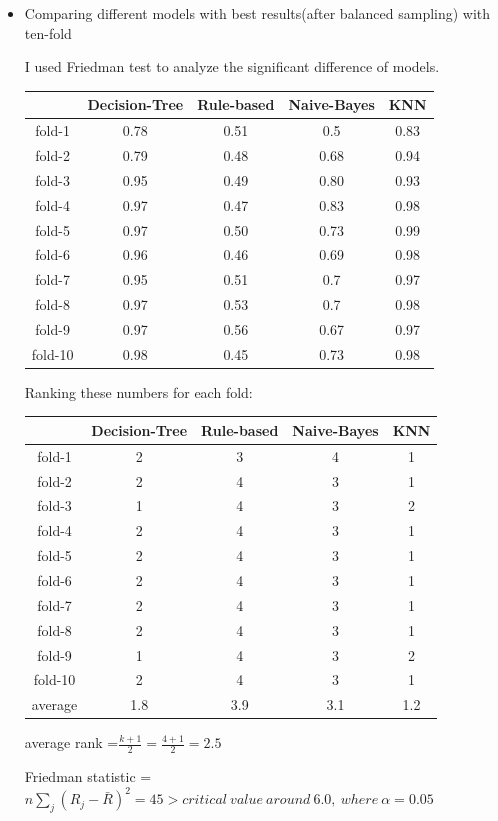 \documentclass{article}
\begin{document}
\begin{itemize}
\item Comparing different models with best results(after balanced sampling) with ten-fold

I used Friedman test to analyze the significant difference of models.

\begin{tabular}{c|c|c|c|c}
\hline
 &Decision-Tree &Rule-based &Naive-Bayes &KNN\\
\hline
fold-1 &0.78 &0.51 &0.5 &0.83\\
\hline
fold-2 &0.79 &0.48 &0.68 &0.94\\
\hline
fold-3 &0.95 &0.49 &0.80 &0.93\\
\hline
fold-4 &0.97 &0.47 &0.83 &0.98\\
\hline
fold-5 &0.97 &0.50 &0.73 &0.99\\
\hline
fold-6 &0.96 &0.46 &0.69 &0.98\\
\hline
fold-7 &0.95 &0.51 &0.7 &0.97\\
\hline
fold-8 &0.97 &0.53 &0.7 &0.98\\
\hline
fold-9 &0.97 &0.56 &0.67 &0.97\\
\hline
fold-10 &0.98 &0.45 &0.73 &0.98\\
\hline
\end{tabular}

Ranking these numbers for each fold:

\begin{tabular}{c|c|c|c|c}
\hline
 &Decision-Tree &Rule-based &Naive-Bayes &KNN\\
\hline
fold-1 &2 &3 &4 &1\\
\hline
fold-2 &2 &4 &3 &1\\
\hline
fold-3 &1 &4 &3 &2\\
\hline
fold-4 &2 &4 &3 &1\\
\hline
fold-5 &2 &4 &3 &1\\
\hline
fold-6 &2 &4 &3 &1\\
\hline
fold-7 &2 &4 &3 &1\\
\hline
fold-8 &2 &4 &3 &1\\
\hline
fold-9 &1 &4 &3 &2\\
\hline
fold-10 &2 &4 &3 &1\\
\hline
average &1.8 &3.9 &3.1 &1.2
\end{tabular}

average rank =$\frac{k + 1}{2} = \frac{4 + 1}{2} = 2.5 $

Friedman statistic = $n\sum_j(R_j-\bar R)^2 = 45 > critical\ value\ around\ 6.0, \ where\ \alpha=0.05$


\end{itemize}
\end{document}
